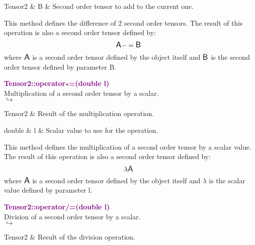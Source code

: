 \begin{tcolorbox}[width=\textwidth,myArgs,tabularx={ll|R}]
Tensor2 & B & Second order tensor to add to the current one.
\end{tcolorbox}

This method defines the difference of 2 second order tensors.
The result of this operation is also a second order tensor defined by:
\begin{equation*}
\mbox{\large\ensuremath{\mathsf{A}}} -= \mbox{\large\ensuremath{\mathsf{B}}}
\end{equation*}
where $\mbox{\large\ensuremath{\mathsf{A}}}$ is a second order tensor defined by the object itself and $\mbox{\large\ensuremath{\mathsf{B}}}$ is the second order tensor defined by parameter B.

\textcolor{purple}{\textbf{Tensor2::operator$\star$=(double l)}}\label{Tensor2::operator*=(double l)}\\
Multiplication of a second order tensor by a scalar.\\ \hspace*{5mm}$\hookrightarrow$
\vspace*{-2em}\begin{tcolorbox}[grow to left by=-1cm, width=\textwidth-1cm,myArgs,tabularx={l|R}]
Tensor2 & Result of the multiplication operation.
\end{tcolorbox}

\begin{tcolorbox}[width=\textwidth,myArgs,tabularx={ll|R}]
double & l & Scalar value to use for the operation.
\end{tcolorbox}

This method defines the multiplication of a second order tensor by a scalar value.
The result of this operation is also a second order tensor defined by:
\begin{equation*}
\lambda \mbox{\large\ensuremath{\mathsf{A}}}
\end{equation*}
where $\mbox{\large\ensuremath{\mathsf{A}}}$ is a second order tensor defined by the object itself and $\lambda$ is the scalar value defined by parameter l.

\textcolor{purple}{\textbf{Tensor2::operator/=(double l)}}\label{Tensor2::operator/=(double l)}\\
Division of a second order tensor by a scalar.\\ \hspace*{5mm}$\hookrightarrow$
\vspace*{-2em}\begin{tcolorbox}[grow to left by=-1cm, width=\textwidth-1cm,myArgs,tabularx={l|R}]
Tensor2 & Result of the division operation.
\end{tcolorbox}

